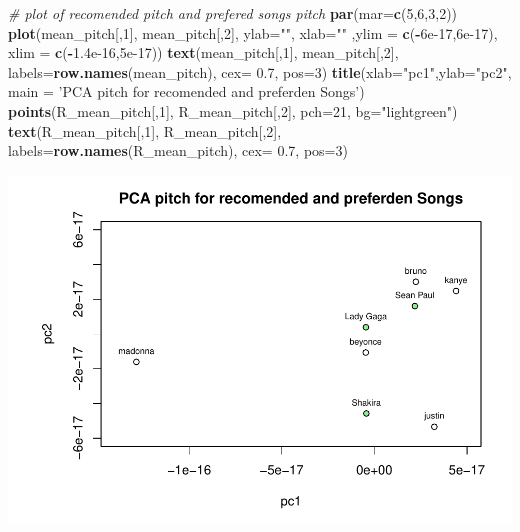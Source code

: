 \documentclass[]{article}
\newenvironment{Shaded}{\begin{snugshade}}{\end{snugshade}}
\newcommand{\KeywordTok}[1]{\textcolor[rgb]{0.13,0.29,0.53}{\textbf{#1}}}
\newcommand{\DataTypeTok}[1]{\textcolor[rgb]{0.13,0.29,0.53}{#1}}
\newcommand{\DecValTok}[1]{\textcolor[rgb]{0.00,0.00,0.81}{#1}}
\newcommand{\FloatTok}[1]{\textcolor[rgb]{0.00,0.00,0.81}{#1}}
\newcommand{\StringTok}[1]{\textcolor[rgb]{0.31,0.60,0.02}{#1}}
\newcommand{\CommentTok}[1]{\textcolor[rgb]{0.56,0.35,0.01}{\textit{#1}}}
\newcommand{\OperatorTok}[1]{\textcolor[rgb]{0.81,0.36,0.00}{\textbf{#1}}}
\newcommand{\NormalTok}[1]{#1}
\begin{document}
\begin{Shaded}
\begin{Highlighting}[]
\CommentTok{# plot of recomended pitch and prefered songs pitch}
\KeywordTok{par}\NormalTok{(}\DataTypeTok{mar=}\KeywordTok{c}\NormalTok{(}\DecValTok{5}\NormalTok{,}\DecValTok{6}\NormalTok{,}\DecValTok{3}\NormalTok{,}\DecValTok{2}\NormalTok{))}
\KeywordTok{plot}\NormalTok{(mean_pitch[,}\DecValTok{1}\NormalTok{], mean_pitch[,}\DecValTok{2}\NormalTok{], }\DataTypeTok{ylab=}\StringTok{""}\NormalTok{, }\DataTypeTok{xlab=}\StringTok{""}\NormalTok{ ,}\DataTypeTok{ylim =} \KeywordTok{c}\NormalTok{(}\OperatorTok{-}\FloatTok{6e-17}\NormalTok{,}\FloatTok{6e-17}\NormalTok{), }\DataTypeTok{xlim =} \KeywordTok{c}\NormalTok{(}\OperatorTok{-}\FloatTok{1.4e-16}\NormalTok{,}\FloatTok{5e-17}\NormalTok{))}
\KeywordTok{text}\NormalTok{(mean_pitch[,}\DecValTok{1}\NormalTok{], mean_pitch[,}\DecValTok{2}\NormalTok{], }\DataTypeTok{labels=}\KeywordTok{row.names}\NormalTok{(mean_pitch), }\DataTypeTok{cex=} \FloatTok{0.7}\NormalTok{, }\DataTypeTok{pos=}\DecValTok{3}\NormalTok{)}
\KeywordTok{title}\NormalTok{(}\DataTypeTok{xlab=}\StringTok{"pc1"}\NormalTok{,}\DataTypeTok{ylab=}\StringTok{"pc2"}\NormalTok{, }\DataTypeTok{main =} \StringTok{'PCA pitch for recomended and preferden Songs'}\NormalTok{)}
\KeywordTok{points}\NormalTok{(R_mean_pitch[,}\DecValTok{1}\NormalTok{], R_mean_pitch[,}\DecValTok{2}\NormalTok{], }\DataTypeTok{pch=}\DecValTok{21}\NormalTok{,  }\DataTypeTok{bg=}\StringTok{"lightgreen"}\NormalTok{)}
\KeywordTok{text}\NormalTok{(R_mean_pitch[,}\DecValTok{1}\NormalTok{], R_mean_pitch[,}\DecValTok{2}\NormalTok{], }\DataTypeTok{labels=}\KeywordTok{row.names}\NormalTok{(R_mean_pitch), }\DataTypeTok{cex=} \FloatTok{0.7}\NormalTok{, }\DataTypeTok{pos=}\DecValTok{3}\NormalTok{)}
\end{Highlighting}
\end{Shaded}

\includegraphics{Project2_files/figure-latex/PCAPitch-1.pdf}
\end{document}
